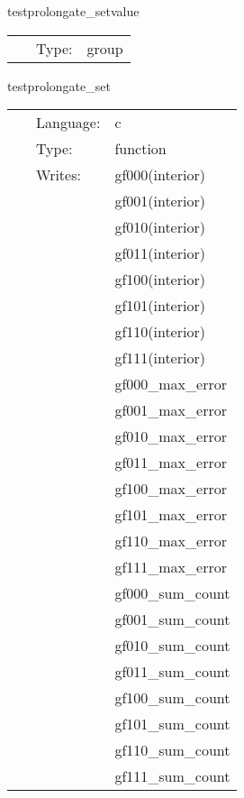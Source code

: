 \vspace{5mm}


\hspace{5mm} testprolongate\_setvalue 

\hspace{5mm}{\it set up test data } 


\hspace{5mm}

 \begin{tabular*}{160mm}{cll} 
~ & Type:  & group \\ 
\end{tabular*} 


\vspace{5mm}


\hspace{5mm} testprolongate\_set 

\hspace{5mm}{\it set up test data } 


\hspace{5mm}

 \begin{tabular*}{160mm}{cll} 
~ & Language:  & c \\ 
~ & Type:  & function \\ 
~ & Writes:  & gf000(interior) \\ 
~& ~ &gf001(interior)\\ 
~& ~ &gf010(interior)\\ 
~& ~ &gf011(interior)\\ 
~& ~ &gf100(interior)\\ 
~& ~ &gf101(interior)\\ 
~& ~ &gf110(interior)\\ 
~& ~ &gf111(interior)\\ 
~& ~ &gf000\_max\_error\\ 
~& ~ &gf001\_max\_error\\ 
~& ~ &gf010\_max\_error\\ 
~& ~ &gf011\_max\_error\\ 
~& ~ &gf100\_max\_error\\ 
~& ~ &gf101\_max\_error\\ 
~& ~ &gf110\_max\_error\\ 
~& ~ &gf111\_max\_error\\ 
~& ~ &gf000\_sum\_count\\ 
~& ~ &gf001\_sum\_count\\ 
~& ~ &gf010\_sum\_count\\ 
~& ~ &gf011\_sum\_count\\ 
~& ~ &gf100\_sum\_count\\ 
~& ~ &gf101\_sum\_count\\ 
~& ~ &gf110\_sum\_count\\ 
~& ~ &gf111\_sum\_count\\ 
\end{tabular*} 


